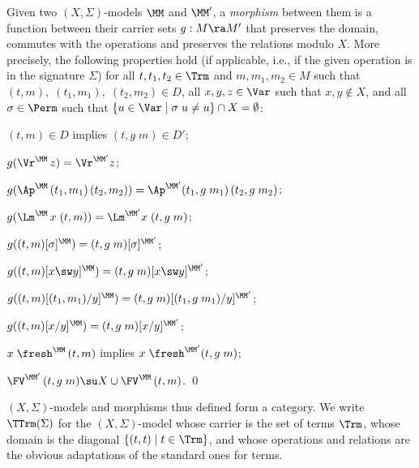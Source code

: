 \medskip
\begin{defi}\rm \label{defi-morphismExtended}
Given two $(X,\Sigma)$-models $\MM$ and $\MM'$, a \emph{morphism} 
between them is a function  between their carrier sets $g: M \ra M'$
that preserves the domain, 
commutes with the operations and preserves the relations modulo $X$. More precisely, 
the following properties hold (if applicable, i.e., if the given operation is in the signature $\Sigma$) for all $t,t_1,t_2\in  \Trm$ and 
$m,m_1,m_2\in  M$ such that $(t,m),\;(t_1,m_1),\;(t_2,m_2) \in D$, all $x,y,z \in \Var$ such that 
$x,y \notin X$, 
and all $\sigma\in\Perm$ such that $\{u \in \Var \mid \sigma\;u \not= u\} \cap X = \emptyset$: 
%
\begin{mmyitem}
%
\item $(t,m) \in D$ implies $(t,g\;m) \in D'$;
%
\item $g(\Vr^\MM\,z) = \Vr^{\MM'}z$; 
%
\item $g(\Ap^\MM\,(t_1,m_1)\,(t_2,m_2)) = \Ap^{\MM'} (t_1,g\;m_1)\,(t_2,g\;m_2)$; 

\item $g(\Lm^\MM\,x\;(t,m)) = \Lm^{\MM'}x\;(t,g\;m)$; 

\item $g((t,m)[\sigma]^\MM) = (t,g\;m)[\sigma]^{\MM'}$; 

\item $g((t,m)[x \sw y]^\MM) = (t,g\;m)[x \sw y]^{\MM'}$; 

\item $g((t,m)[(t_1,m_1) / y]^\MM) = (t,g\;m)[(t_1,g\;m_1) / y]^{\MM'}$; 

\item $g((t,m)[x / y]^\MM) = (t,g\;m)[x / y]^{\MM'}$; 

\item $x\;\fresh^\MM\, (t,m)$ implies $x\;\fresh^{\MM'} (t,g\;m)$;

\item $\FV^{\MM'}\,(t,g\;m) \su X \cup \FV^\MM\,(t,m)$.   \qed 
\end{mmyitem}
\end{defi} 
\medskip 

$(X,\Sigma)$-models and morphisms thus defined form a category. 
We write $\TTrm(\Sigma)$ for the $(X,\Sigma)$-model whose carrier is the set of terms $\Trm$, 
whose domain is the diagonal $\{(t,t) \mid t \in \Trm\}$, 
and whose operations and relations are the obvious adaptations of the standard ones for terms. 


